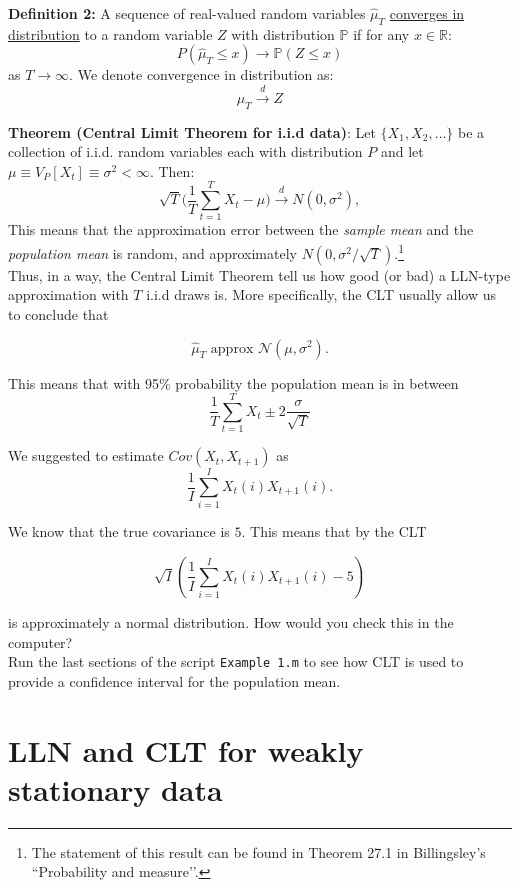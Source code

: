 \documentclass[12] {article}
\begin{document}
\textbf{Definition 2:} A sequence of real-valued random variables $\widehat{\mu}_{T}$ \underline{converges in distribution} to a random variable $Z$ with distribution $\mathbb{P}$ if for any $x \in \mathbb{R}$:
\[ P( \widehat{\mu}_T  \leq x) \rightarrow \mathbb{P}( Z \leq x )   \]
as $T \rightarrow \infty$. We denote convergence in distribution as:
$$ \mu_{T} \overset{d}{\rightarrow} Z $$

\noindent \textbf{Theorem (Central Limit Theorem for i.i.d data)}:  Let $\{X_1, X_2, \ldots\}$ be a collection of i.i.d. random variables each with distribution $P$ and let $\mu \equiv V_{P}[X_t] \equiv \sigma^2 < \infty$. Then:
\[ \sqrt{T} \Big( \frac{1}{T} \sum_{t=1}^{T} X_t - \mu \Big)    \overset{d}{\rightarrow} N(0,\sigma^2), \]
This means that the approximation error between the \emph{sample mean} and the \emph{population mean} is random, and approximately $N(0, \sigma^2 / \sqrt{T})$.\footnote{The statement of this result can be found in Theorem 27.1 in Billingsley’s ``Probability and measure’’.} \\

\noindent Thus, in a way, the Central Limit Theorem tell us how good (or bad) a LLN-type approximation with $T$ i.i.d draws is. More specifically, the CLT usually allow us to conclude that 

\[ \widehat{\mu}_{T} \textrm{ approx } \mathcal{N}(\mu, \sigma^2).\]

\noindent This means that with 95\% probability the population mean is in between 
$$ \frac{1}{T} \sum_{t=1}^{T} X_t  \pm 2 \frac{\sigma}{\sqrt{T}} $$

 We suggested to estimate $Cov(X_t,X_{t+1})$ as 
\[ \frac{1}{I} \sum_{i=1}^{I} X_{t}(i) X_{t+1}(i). \]

\noindent We know that the true covariance is $5$. This means that by the CLT

\[  \sqrt{I} \left( \frac{1}{I} \sum_{i=1}^{I} X_{t}(i) X_{t+1}(i) - 5 \right) \]

\noindent is approximately a normal distribution. How would you check this in the computer?\\


 Run the last sections of the script \texttt{Example 1.m} to see how CLT is used to provide a confidence interval for the population mean.  \\

\newpage

\section{LLN and CLT for weakly stationary data}
\end{document}
